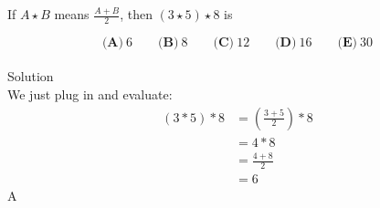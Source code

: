 

If $ A \star B$ means $ \frac{A+B}{2}$, then $ (3 \star 5) \star 8$ is

\[ \textbf{(A)}\ 6 \qquad
\textbf{(B)}\ 8 \qquad
\textbf{(C)}\ 12 \qquad
\textbf{(D)}\ 16 \qquad
\textbf{(E)}\ 30
\]
\\
Solution
\\
We just plug in and evaluate: \begin{align*} (3*5)*8 &= \left( \frac{3+5}{2}\right) *8 \\ &= 4*8 \\ &= \frac{4+8}{2} \\ &= 6 \\ \end{align*}
$\boxed{\text{A}}$